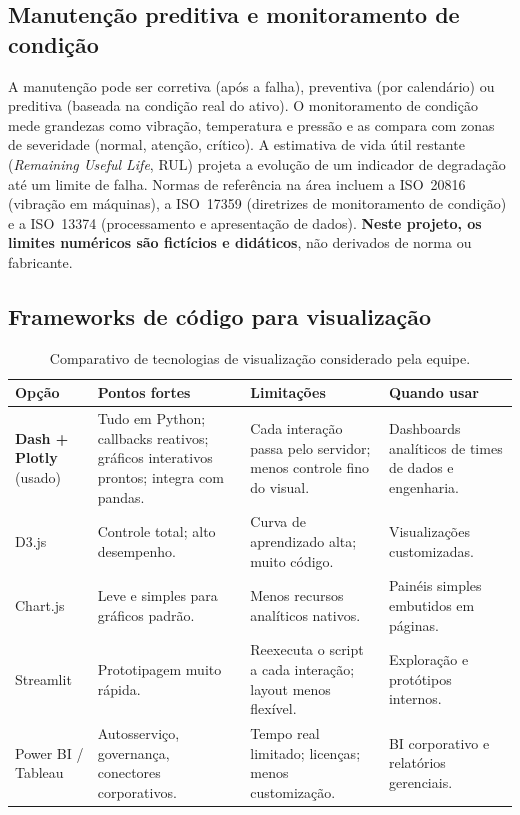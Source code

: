 \documentclass[12pt,a4paper]{article}
\begin{document}
\subsection{Manutenção preditiva e monitoramento de condição}
A manutenção pode ser corretiva (após a falha), preventiva (por calendário) ou preditiva (baseada na condição real do ativo). O monitoramento de condição
mede grandezas como vibração, temperatura e pressão e as compara com zonas de severidade (normal, atenção, crítico). A estimativa de vida útil restante
(\emph{Remaining Useful Life}, RUL) projeta a evolução de um indicador de degradação até um limite de falha. Normas de referência na área incluem a
ISO~20816 (vibração em máquinas), a ISO~17359 (diretrizes de monitoramento de condição) e a ISO~13374 (processamento e apresentação de dados).
\textbf{Neste projeto, os limites numéricos são fictícios e didáticos}, não derivados de norma ou fabricante.

\subsection{Frameworks de código para visualização}
\begin{table}[H]
\centering
\caption{Comparativo de tecnologias de visualização considerado pela equipe.}
\label{tab:comparativo}
\small
\begin{tabularx}{\textwidth}{@{}l X X X@{}}
\toprule
\textbf{Opção} & \textbf{Pontos fortes} & \textbf{Limitações} & \textbf{Quando usar}\\
\midrule
\textbf{Dash + Plotly} (usado) & Tudo em Python; callbacks reativos; gráficos interativos prontos; integra com pandas. & Cada interação passa pelo servidor; menos controle fino do visual. & Dashboards analíticos de times de dados e engenharia.\\
D3.js & Controle total; alto desempenho. & Curva de aprendizado alta; muito código. & Visualizações customizadas.\\
Chart.js & Leve e simples para gráficos padrão. & Menos recursos analíticos nativos. & Painéis simples embutidos em páginas.\\
Streamlit & Prototipagem muito rápida. & Reexecuta o script a cada interação; layout menos flexível. & Exploração e protótipos internos.\\
Power BI / Tableau & Autosserviço, governança, conectores corporativos. & Tempo real limitado; licenças; menos customização. & BI corporativo e relatórios gerenciais.\\
\bottomrule
\end{tabularx}
\end{table}
\end{document}
